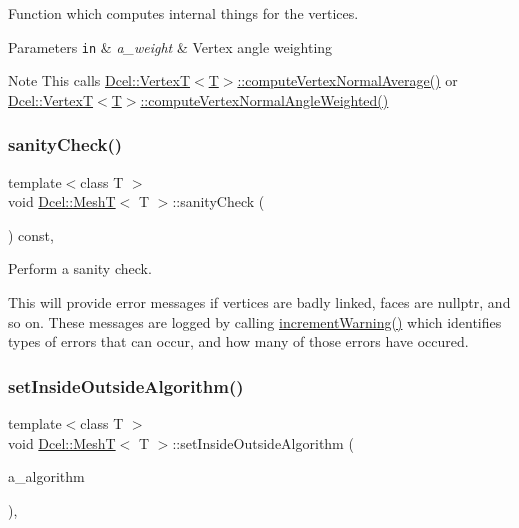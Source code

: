 Function which computes internal things for the vertices. 


\begin{DoxyParams}[1]{Parameters}
\mbox{\tt in}  & {\em a\+\_\+weight} & Vertex angle weighting \\
\hline
\end{DoxyParams}
\begin{DoxyNote}{Note}
This calls \hyperlink{classDcel_1_1VertexT_adb439515e1814e3fdd9d040b9c1b22df}{Dcel\+::\+Vertex\+T$<$\+T$>$\+::compute\+Vertex\+Normal\+Average()} or \hyperlink{classDcel_1_1VertexT_aa9e66780ec134afe94d9e5a8221fdc0e}{Dcel\+::\+Vertex\+T$<$\+T$>$\+::compute\+Vertex\+Normal\+Angle\+Weighted()} 
\end{DoxyNote}
\mbox{\label{classDcel_1_1MeshT_a1814ba63c6e0d7a007ee78c24d6ea159}} 
\subsubsection{\texorpdfstring{sanity\+Check()}{sanityCheck()}}
{\footnotesize\ttfamily template$<$class T $>$ \\
void \hyperlink{classDcel_1_1MeshT}{Dcel\+::\+MeshT}$<$ T $>$\+::sanity\+Check (\begin{DoxyParamCaption}{ }\end{DoxyParamCaption}) const\hspace{0.3cm}{\ttfamily [inline]}, {\ttfamily [noexcept]}}



Perform a sanity check. 

This will provide error messages if vertices are badly linked, faces are nullptr, and so on. These messages are logged by calling \hyperlink{classDcel_1_1MeshT_ae13801eefa60ad08ff1da0df1da34784}{increment\+Warning()} which identifies types of errors that can occur, and how many of those errors have occured. \mbox{\label{classDcel_1_1MeshT_a1e46a744a2526e451229e2f2e4830ca5}} 
\subsubsection{\texorpdfstring{set\+Inside\+Outside\+Algorithm()}{setInsideOutsideAlgorithm()}}
{\footnotesize\ttfamily template$<$class T $>$ \\
void \hyperlink{classDcel_1_1MeshT}{Dcel\+::\+MeshT}$<$ T $>$\+::set\+Inside\+Outside\+Algorithm (\begin{DoxyParamCaption}\item[{typename \hyperlink{classDcel_1_1Polygon2D}{Dcel\+::\+Polygon2D}$<$ T $>$\+::Inside\+Outside\+Algorithm}]{a\+\_\+algorithm }\end{DoxyParamCaption})\hspace{0.3cm}{\ttfamily [inline]}, {\ttfamily [noexcept]}}



